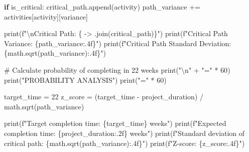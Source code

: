 \documentclass[
  letterpaper,
  DIV=11,
  numbers=noendperiod]{scrreprt}
\newenvironment{Shaded}{\begin{snugshade}}{\end{snugshade}}
\newcommand{\BuiltInTok}[1]{\textcolor[rgb]{0.00,0.23,0.31}{#1}}
\newcommand{\CharTok}[1]{\textcolor[rgb]{0.13,0.47,0.30}{#1}}
\newcommand{\CommentTok}[1]{\textcolor[rgb]{0.37,0.37,0.37}{#1}}
\newcommand{\ControlFlowTok}[1]{\textcolor[rgb]{0.00,0.23,0.31}{\textbf{#1}}}
\newcommand{\DecValTok}[1]{\textcolor[rgb]{0.68,0.00,0.00}{#1}}
\newcommand{\NormalTok}[1]{\textcolor[rgb]{0.00,0.23,0.31}{#1}}
\newcommand{\OperatorTok}[1]{\textcolor[rgb]{0.37,0.37,0.37}{#1}}
\newcommand{\SpecialCharTok}[1]{\textcolor[rgb]{0.37,0.37,0.37}{#1}}
\newcommand{\SpecialStringTok}[1]{\textcolor[rgb]{0.13,0.47,0.30}{#1}}
\newcommand{\StringTok}[1]{\textcolor[rgb]{0.13,0.47,0.30}{#1}}
\begin{document}
\begin{Shaded}
\begin{Highlighting}[]
        \ControlFlowTok{if}\NormalTok{ is\_critical:}
\NormalTok{            critical\_path.append(activity)}
\NormalTok{            path\_variance }\OperatorTok{+=}\NormalTok{ activities[activity][}\StringTok{\textquotesingle{}variance\textquotesingle{}}\NormalTok{]}
    
    \BuiltInTok{print}\NormalTok{(}\SpecialStringTok{f"}\CharTok{\textbackslash{}n}\SpecialStringTok{Critical Path: }\SpecialCharTok{\{}\StringTok{\textquotesingle{} {-}\textgreater{} \textquotesingle{}}\SpecialCharTok{.}\NormalTok{join(critical\_path)}\SpecialCharTok{\}}\SpecialStringTok{"}\NormalTok{)}
    \BuiltInTok{print}\NormalTok{(}\SpecialStringTok{f"Critical Path Variance: }\SpecialCharTok{\{}\NormalTok{path\_variance}\SpecialCharTok{:.4f\}}\SpecialStringTok{"}\NormalTok{)}
    \BuiltInTok{print}\NormalTok{(}\SpecialStringTok{f"Critical Path Standard Deviation: }\SpecialCharTok{\{}\NormalTok{math}\SpecialCharTok{.}\NormalTok{sqrt(path\_variance)}\SpecialCharTok{:.4f\}}\SpecialStringTok{"}\NormalTok{)}
    
    \CommentTok{\# Calculate probability of completing in 22 weeks}
    \BuiltInTok{print}\NormalTok{(}\StringTok{"}\CharTok{\textbackslash{}n}\StringTok{"} \OperatorTok{+} \StringTok{"="} \OperatorTok{*} \DecValTok{60}\NormalTok{)}
    \BuiltInTok{print}\NormalTok{(}\StringTok{"PROBABILITY ANALYSIS"}\NormalTok{)}
    \BuiltInTok{print}\NormalTok{(}\StringTok{"="} \OperatorTok{*} \DecValTok{60}\NormalTok{)}
    
\NormalTok{    target\_time }\OperatorTok{=} \DecValTok{22}
\NormalTok{    z\_score }\OperatorTok{=}\NormalTok{ (target\_time }\OperatorTok{{-}}\NormalTok{ project\_duration) }\OperatorTok{/}\NormalTok{ math.sqrt(path\_variance)}
    
    \BuiltInTok{print}\NormalTok{(}\SpecialStringTok{f"Target completion time: }\SpecialCharTok{\{}\NormalTok{target\_time}\SpecialCharTok{\}}\SpecialStringTok{ weeks"}\NormalTok{)}
    \BuiltInTok{print}\NormalTok{(}\SpecialStringTok{f"Expected completion time: }\SpecialCharTok{\{}\NormalTok{project\_duration}\SpecialCharTok{:.2f\}}\SpecialStringTok{ weeks"}\NormalTok{)}
    \BuiltInTok{print}\NormalTok{(}\SpecialStringTok{f"Standard deviation of critical path: }\SpecialCharTok{\{}\NormalTok{math}\SpecialCharTok{.}\NormalTok{sqrt(path\_variance)}\SpecialCharTok{:.4f\}}\SpecialStringTok{"}\NormalTok{)}
    \BuiltInTok{print}\NormalTok{(}\SpecialStringTok{f"Z{-}score: }\SpecialCharTok{\{}\NormalTok{z\_score}\SpecialCharTok{:.4f\}}\SpecialStringTok{"}\NormalTok{)}
    

\end{Highlighting}
\end{Shaded}
\end{document}
